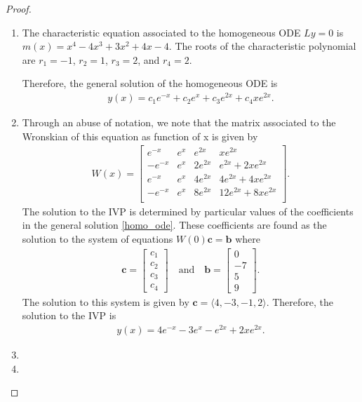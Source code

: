 \documentclass[12pt]{article}
\theoremstyle{definition}
\newcommand{\vect}[1]{\boldsymbol{#1}}
\begin{document}
\begin{proof}
  \begin{enumerate}
    \item The characteristic equation associated to the homogeneous ODE $Ly=0$
      is $m(x) = x^4 - 4 x^3 + 3x^2 + 4x - 4$. The roots of the characteristic
      polynomial are $r_1 = -1$, $r_2=1$, $r_3=2$, and $r_4=2$.

      Therefore, the general solution of the homogeneous ODE is
      \begin{align}\label{homo_ode}
        y(x) = c_1 e^{-x} + c_2 e^{x} + c_3e^{2x} +c_4xe^{2x}.
      \end{align}
    \item Through an abuse of notation, we note that the matrix associated to the Wronskian
      of this equation as function of x is given by
      \begin{align*}
        W(x) =
        \begin{bmatrix}
          e^{-x} & e^{x} & e^{2x} & xe^{2x} \\
          -e^{-x} & e^{x} & 2e^{2x} & e^{2x} + 2xe^{2x} \\
          e^{-x} & e^{x} & 4e^{2x} & 4e^{2x} + 4xe^{2x} \\
          -e^{-x} & e^{x} & 8e^{2x} & 12e^{2x} + 8xe^{2x} \\
        \end{bmatrix}.
      \end{align*}
      The solution to the IVP is determined by particular values of the coefficients in the
      general solution \eqref{homo_ode}. These coefficients are found as the
      solution to the system of equations
      $W(0)\vect{c} = \vect{b}$ where
      \begin{align*}
        \vect{c} = \begin{bmatrix}c_1 \\ c_2 \\ c_3 \\ c_4 \end{bmatrix}\quad\text{and}\quad
        \vect{b} = \begin{bmatrix} 0 \\ -7 \\ 5 \\ 9 \end{bmatrix}.
      \end{align*}
      The solution to this system is given by $\vect{c} = \langle 4,-3,-1,2 \rangle$.
      Therefore, the solution to the IVP is
      \begin{align*}
        y(x) = 4 e^{-x} -3e^{x} -e^{2x} +2xe^{2x}.
      \end{align*}
    \item
    \item
  \end{enumerate}
\end{proof}
\newpage
\end{document}

